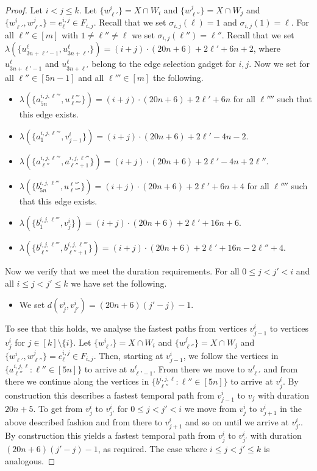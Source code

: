 \documentclass[a4paper,UKenglish,cleveref, autoref, thm-restate]{lipics-v2021}
\begin{document}
\begin{proof}
Let $i<j\le k$. 
Let $\{w^i_{\ell'}\}=X\cap W_i$ and $\{w^j_{\ell''}\}=X\cap W_j$ and $\{w^i_{\ell'},w^j_{\ell''}\}=e^{i,j}_\ell\in F_{i,j}$. 
Recall that we set $\sigma_{i,j}(\ell)=1$ and $\sigma_{i,j}(1)=\ell$. For all $\ell''\in[m]$ with $1\neq\ell''\neq\ell$ we set $\sigma_{i,j}(\ell'')=\ell''$.
Recall that we set $\lambda(\{u^{\ell}_{3n+\ell'-1},u^{\ell}_{3n+\ell'}\})=(i+j)\cdot (20n+6)+2\ell'+6n+2$, where $u^{\ell}_{3n+\ell'-1}$ and $u^{\ell}_{3n+\ell'}$ belong to the edge selection gadget for $i,j$.
Now we set for all $\ell''\in[5n-1]$ and all $\ell'''\in[m]$ the following.
\begin{itemize}
    \item $\lambda(\{a^{i,j,\ell'''}_{5n},u^{\ell'''}_{\ell''''}\})=(i+j)\cdot (20n+6)+2\ell'+6n$ for all $\ell''''$ such that this edge exists.
    \item $\lambda(\{a^{i,j,\ell'''}_{1},v^i_{j-1}\})=(i+j)\cdot (20n+6)+2\ell'-4n-2$.
    \item $\lambda(\{a^{i,j,\ell'''}_{\ell''},a^{i,j,\ell'''}_{\ell''+1}\})=(i+j)\cdot (20n+6)+2\ell'-4n+2\ell''$.
    \item $\lambda(\{b^{i,j,\ell'''}_{5n},u^{\ell'''}_{\ell''''}\})=(i+j)\cdot (20n+6)+2\ell'+6n+4$ for all $\ell''''$ such that this edge exists.
    \item $\lambda(\{b^{i,j,\ell'''}_{1},v^i_{j}\})=(i+j)\cdot (20n+6)+2\ell'+16n+6$.
    \item $\lambda(\{b^{i,j,\ell'''}_{\ell''},b^{i,j,\ell'''}_{\ell''+1}\})=(i+j)\cdot (20n+6)+2\ell'+16n-2\ell''+4$.
\end{itemize}

Now we verify that we meet the duration requirements.
For all $0\le j<j'<i$ and all $i\le j<j'\le k$ we have set the following.
\begin{itemize}
    \item We set $d(v^i_j,v^i_{j'})=(20n+6)(j'-j)-1$.
\end{itemize}
To see that this holds, we analyse the fastest paths from vertices $v^i_{j-1}$ to vertices $v^i_j$ for $j\in[k]\setminus\{i\}$. 
Let $\{w^i_{\ell'}\}=X\cap W_i$ and $\{w^j_{\ell''}\}=X\cap W_j$ and $\{w^i_{\ell'},w^j_{\ell''}\}=e^{i,j}_\ell\in F_{i,j}$. Then, starting at $v^i_{j-1}$, we follow the vertices in $\{a^{i,j,\ell}_{\ell''} :  \ell''\in[5n]\}$ to arrive at $u^{\ell}_{\ell'-1}$. From there we move to $u^{\ell}_{\ell'}$ and from there we continue along the vertices in $\{b^{i,j,\ell}_{\ell''} :  \ell''\in[5n]\}$ to arrive at $v^i_j$. By construction this describes a fastest temporal path from $v^i_{j-1}$ to $v_j$ with duration $20n+5$.
To get from $v^i_j$ to $v^i_{j'}$ for $0\le j<j'<i$ we move from $v^i_j$ to $v^i_{j+1}$ in the above described fashion and from there to $v^i_{j+1}$ and so on until we arrive at $v^i_{j'}$. By construction this yields a fastest temporal path from $v^i_j$ to $v^i_{j'}$ with duration $(20n+6)(j'-j)-1$, as required.
The case where $i\le j<j'\le k$ is analogous.


\end{proof}
\end{document}
